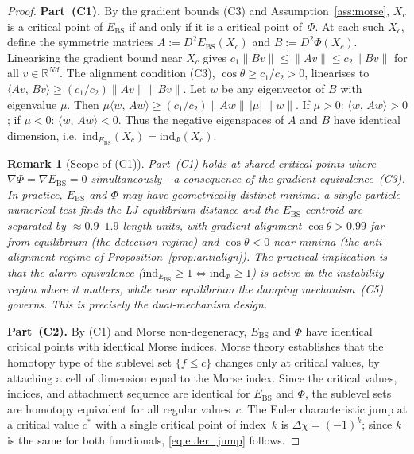 \documentclass[final]{siamltex}
\newcommand{\R}{\mathbb{R}}
\newcommand{\norm}[1]{\lVert #1 \rVert}
\newcommand{\inner}[2]{\langle #1,\, #2 \rangle}
\providecommand{\grad}{\nabla}
\newcommand{\Ebs}{E_{\mathrm{BS}}}
\newcommand{\costheta}{\cos\theta}
\newtheorem{remark}[theorem]{Remark}
\begin{document}
\begin{proof}
\textbf{Part~(C1).}
By the gradient bounds (C3) and Assumption~\ref{ass:morse},
$X_c$ is a critical point of $\Ebs$ if and only if it is a
critical point of~$\Phi$. At each such $X_c$, define the
symmetric matrices $A:=D^2\Ebs(X_c)$ and $B:=D^2\Phi(X_c)$.
Linearising the gradient bound near $X_c$ gives
$c_1\norm{Bv}\le\norm{Av}\le c_2\norm{Bv}$ for all
$v\in\R^{Nd}$.  The alignment condition (C3),
$\costheta\ge c_1/c_2>0$, linearises to
$\inner{Av}{Bv}\ge(c_1/c_2)\norm{Av}\norm{Bv}$.
Let $w$ be any eigenvector of $B$ with eigenvalue $\mu$.
Then $\mu\inner{w}{Aw}\ge(c_1/c_2)\norm{Aw}\,|\mu|\,\norm{w}$.
If $\mu>0$: $\inner{w}{Aw}>0$; if $\mu<0$: $\inner{w}{Aw}<0$.
Thus the negative eigenspaces of $A$ and $B$ have identical
dimension, i.e.\
$\mathrm{ind}_{\Ebs}(X_c) = \mathrm{ind}_\Phi(X_c)$.

\begin{remark}[Scope of (C1)]\label{rem:c1scope}
Part~(C1) holds at \emph{shared} critical points where
$\grad\Phi=\grad\Ebs=0$ simultaneously - a consequence of
the gradient equivalence~(C3).  In practice, $\Ebs$ and $\Phi$
may have geometrically distinct minima: a single-particle
numerical test finds the LJ equilibrium distance and the
$\Ebs$ centroid are separated by $\approx 0.9$--$1.9$ length
units, with gradient alignment $\costheta>0.99$ far from
equilibrium (the detection regime) and $\costheta<0$ near
minima (the anti-alignment regime of
Proposition~\ref{prop:antialign}).  The practical implication
is that the \emph{alarm equivalence}
($\mathrm{ind}_{\Ebs}\ge 1\Leftrightarrow\mathrm{ind}_\Phi
\ge 1$) is active in the instability region where it matters,
while near equilibrium the damping mechanism~(C5) governs.
This is precisely the dual-mechanism design.
\end{remark}

\textbf{Part~(C2).}
By (C1) and Morse non-degeneracy, $\Ebs$ and $\Phi$ have
identical critical points with identical Morse indices.
Morse theory \cite{milnor1963morse} establishes that the
homotopy type of the sublevel set $\{f \le c\}$ changes only
at critical values, by attaching a cell of dimension equal
to the Morse index.  Since the critical values, indices, and
attachment sequence are identical for $\Ebs$ and $\Phi$, the
sublevel sets are homotopy equivalent for all regular
values~$c$.  The Euler characteristic jump at a critical
value $c^*$ with a single critical point of index~$k$ is
$\Delta\chi = (-1)^k$; since $k$ is the same for both
functionals, \eqref{eq:euler_jump} follows.


\end{proof}
\end{document}
